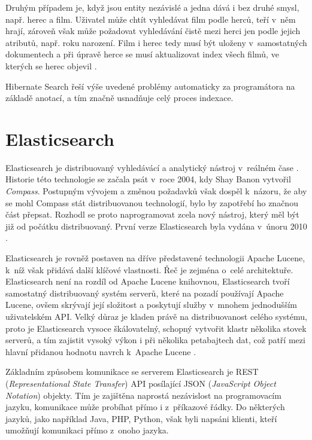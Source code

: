 \documentclass[11pt,oneside]{fithesis2}
\begin{document}
Druhým případem je, když jsou entity nezávislé a jedna dává i bez druhé smysl, např. herec a film. Uživatel může chtít vyhledávat film podle herců, teří v~něm hrají, zároveň však může požadovat vyhledávání čistě mezi herci jen podle jejich atributů, např. roku narození. Film i herec tedy musí být uloženy v~samostatných dokumentech a při úpravě herce se musí aktualizovat index všech filmů, ve kterých se herec objevil \cite[str. 110]{HibernateSearchAction}. 

Hibernate Search řeší výše uvedené problémy automaticky za programátora na základě anotací, a tím značně usnadňuje celý proces indexace.

\section{Elasticsearch}
\label{ElasticsearchChapter}
Elasticsearch je distribuovaný vyhledávácí a analytický nástroj v~reálném čase \cite{ElasticsearchDefinitiveGuide}. Historie této technologie se začala psát v~roce 2004, kdy Shay Banon vytvořil \emph{Compass}. Postupným vývojem a změnou požadavků však dospěl k~názoru, že aby se mohl Compass stát distribuovanou technologií, bylo by zapotřebí ho značnou část přepsat. Rozhodl se proto naprogramovat zcela nový nástroj, který měl být již od počátku distribuovaný. První verze Elasticsearch byla vydána v~únoru 2010 \cite{ElasticsearchWiki}.

Elasticsearch je rovněž postaven na dříve představené technologii Apache Lucene, k~níž však přidává další klíčové vlastnosti. Řeč je zejména o~celé architektuře. Elasticsearch není na rozdíl od Apache Lucene knihovnou, Elasticsearch tvoří samostatný distribuovaný systém serverů, které na pozadí používají Apache Lucene, ovšem skrývají její složitost a poskytují služby v~mnohem jednodušším uživatelském API. Velký důraz je kladen právě na distribuovanost celého systému, proto je Elasticsearch vysoce škálovatelný, schopný vytvořit klastr několika stovek serverů, a tím zajistit vysoký výkon i při několika petabajtech dat, což patří mezi hlavní přidanou hodnotu navrch k~Apache Lucene \cite{ElasticsearchDefinitiveGuide}.

Základním způsobem komunikace se serverem Elasticsearch je REST (\emph{Representational State Transfer}) API posílající JSON (\emph{JavaScript Object Notation}) objekty. Tím je zajištěna naprostá nezávislost na programovacím jazyku, komunikace může probíhat přímo i z~příkazové řádky. Do některých jazyků, jako například Java, PHP, Python, však byli napsáni klienti, kteří umožňují komunikaci přímo z~onoho jazyka. 
\end{document}
